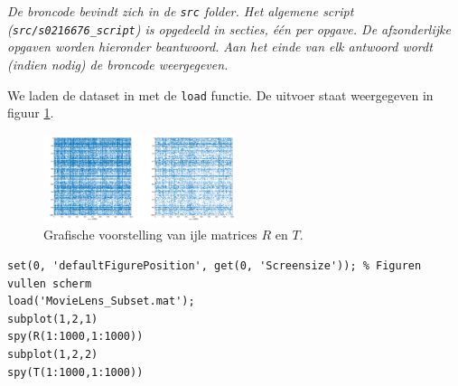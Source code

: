 
\begin{center}
\textit{De broncode bevindt zich in de \texttt{src} folder. Het algemene script (\texttt{src/s0216676\_script}) is opgedeeld in secties, \'e\'en per opgave. De afzonderlijke opgaven worden hieronder beantwoord. Aan het einde van elk antwoord wordt (indien nodig) de broncode weergegeven.}
\end{center}



We laden de dataset in met de \texttt{load} functie. De uitvoer staat weergegeven in figuur \ref{fig:op1}.

\vspace{0.3cm}
\begin{figure}[h]
\centering
\includegraphics[width=0.5\textwidth]{res/op1.png}
\caption{Grafische voorstelling van ijle matrices $R$ en $T$.}
\label{fig:op1}
\end{figure}

\begin{lstlisting}
set(0, 'defaultFigurePosition', get(0, 'Screensize')); % Figuren vullen scherm
load('MovieLens_Subset.mat');
subplot(1,2,1)
spy(R(1:1000,1:1000))
subplot(1,2,2)
spy(T(1:1000,1:1000))
\end{lstlisting}



